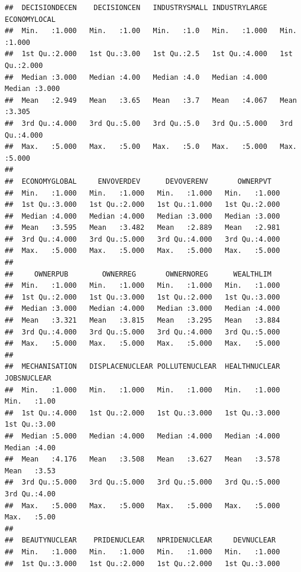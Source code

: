 \documentclass[
]{article}
\begin{document}
\begin{verbatim}
##  DECISIONDECEN    DECISIONCEN   INDUSTRYSMALL INDUSTRYLARGE    ECONOMYLOCAL  
##  Min.   :1.000   Min.   :1.00   Min.   :1.0   Min.   :1.000   Min.   :1.000  
##  1st Qu.:2.000   1st Qu.:3.00   1st Qu.:2.5   1st Qu.:4.000   1st Qu.:2.000  
##  Median :3.000   Median :4.00   Median :4.0   Median :4.000   Median :3.000  
##  Mean   :2.949   Mean   :3.65   Mean   :3.7   Mean   :4.067   Mean   :3.305  
##  3rd Qu.:4.000   3rd Qu.:5.00   3rd Qu.:5.0   3rd Qu.:5.000   3rd Qu.:4.000  
##  Max.   :5.000   Max.   :5.00   Max.   :5.0   Max.   :5.000   Max.   :5.000  
##                                                                              
##  ECONOMYGLOBAL     ENVOVERDEV      DEVOVERENV       OWNERPVT    
##  Min.   :1.000   Min.   :1.000   Min.   :1.000   Min.   :1.000  
##  1st Qu.:3.000   1st Qu.:2.000   1st Qu.:1.000   1st Qu.:2.000  
##  Median :4.000   Median :4.000   Median :3.000   Median :3.000  
##  Mean   :3.595   Mean   :3.482   Mean   :2.889   Mean   :2.981  
##  3rd Qu.:4.000   3rd Qu.:5.000   3rd Qu.:4.000   3rd Qu.:4.000  
##  Max.   :5.000   Max.   :5.000   Max.   :5.000   Max.   :5.000  
##                                                                 
##     OWNERPUB        OWNERREG       OWNERNOREG      WEALTHLIM    
##  Min.   :1.000   Min.   :1.000   Min.   :1.000   Min.   :1.000  
##  1st Qu.:2.000   1st Qu.:3.000   1st Qu.:2.000   1st Qu.:3.000  
##  Median :3.000   Median :4.000   Median :3.000   Median :4.000  
##  Mean   :3.321   Mean   :3.815   Mean   :3.295   Mean   :3.884  
##  3rd Qu.:4.000   3rd Qu.:5.000   3rd Qu.:4.000   3rd Qu.:5.000  
##  Max.   :5.000   Max.   :5.000   Max.   :5.000   Max.   :5.000  
##                                                                 
##  MECHANISATION   DISPLACENUCLEAR POLLUTENUCLEAR  HEALTHNUCLEAR    JOBSNUCLEAR  
##  Min.   :1.000   Min.   :1.000   Min.   :1.000   Min.   :1.000   Min.   :1.00  
##  1st Qu.:4.000   1st Qu.:2.000   1st Qu.:3.000   1st Qu.:3.000   1st Qu.:3.00  
##  Median :5.000   Median :4.000   Median :4.000   Median :4.000   Median :4.00  
##  Mean   :4.176   Mean   :3.508   Mean   :3.627   Mean   :3.578   Mean   :3.53  
##  3rd Qu.:5.000   3rd Qu.:5.000   3rd Qu.:5.000   3rd Qu.:5.000   3rd Qu.:4.00  
##  Max.   :5.000   Max.   :5.000   Max.   :5.000   Max.   :5.000   Max.   :5.00  
##                                                                                
##  BEAUTYNUCLEAR    PRIDENUCLEAR   NPRIDENUCLEAR     DEVNUCLEAR   
##  Min.   :1.000   Min.   :1.000   Min.   :1.000   Min.   :1.000  
##  1st Qu.:3.000   1st Qu.:2.000   1st Qu.:2.000   1st Qu.:3.000  

\end{verbatim}
\end{document}
